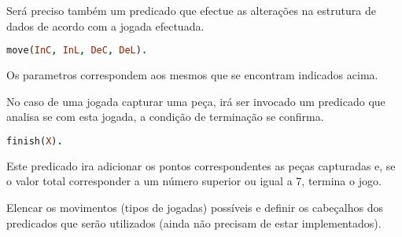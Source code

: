 \documentclass[a4paper]{article}
\begin{document}
Será preciso também um predicado que efectue as alterações na estrutura de dados de acordo com a jogada efectuada.
\bigskip
\begin{lstlisting}[language=Prolog]
move(InC, InL, DeC, DeL).
\end{lstlisting}
\bigskip

Os parametros correspondem aos mesmos que se encontram indicados acima.
\bigskip

No caso de uma jogada capturar uma peça, irá ser invocado um predicado que analisa se com esta jogada, a condição de terminação se confirma.
\begin{lstlisting}[language=Prolog]
finish(X).
\end{lstlisting}
\newline
Este predicado ira adicionar os pontos correspondentes as peças capturadas e, se o valor total corresponder a um número superior ou igual a 7, termina o jogo.

\bigskip
Elencar os movimentos (tipos de jogadas) possíveis e definir os cabeçalhos dos predicados que serão utilizados (ainda não precisam de estar implementados).
\end{document}
